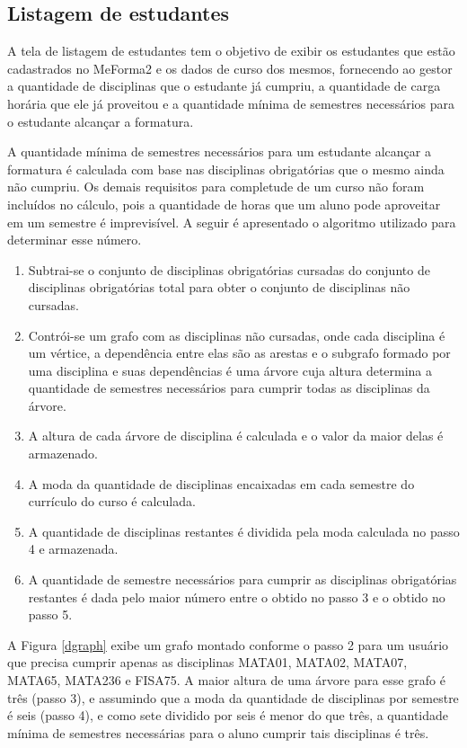 \subsection{Listagem de estudantes}

A tela de listagem de estudantes tem o objetivo de exibir os estudantes que estão cadastrados no MeForma2 e os dados de curso dos mesmos, fornecendo ao gestor a quantidade de disciplinas que o estudante já cumpriu, a quantidade de carga horária que ele já proveitou e a quantidade mínima de semestres necessários para o estudante alcançar a formatura.

A quantidade mínima de semestres necessários para um estudante alcançar a formatura é calculada com base nas disciplinas obrigatórias que o mesmo ainda não cumpriu. Os demais requisitos para completude de um curso não foram incluídos no cálculo, pois a quantidade de horas que um aluno pode aproveitar em um semestre é imprevisível. A seguir é apresentado o algoritmo utilizado para determinar esse número.

\begin{enumerate}
    \item Subtrai-se o conjunto de disciplinas obrigatórias cursadas do conjunto de disciplinas obrigatórias total para obter o conjunto de disciplinas não cursadas.
    \item Contrói-se um grafo com as disciplinas não cursadas, onde cada disciplina é um vértice, a dependência entre elas são as arestas e o subgrafo formado por uma disciplina e suas dependências é uma árvore cuja altura determina a quantidade de semestres necessários para cumprir todas as disciplinas da árvore.
    \item A altura de cada árvore de disciplina é calculada e o valor da maior delas é armazenado.
    \item A moda da quantidade de disciplinas encaixadas em cada semestre do currículo do curso é calculada.
    \item A quantidade de disciplinas restantes é dividida pela moda calculada no passo 4 e armazenada.
    \item A quantidade de semestre necessários para cumprir as disciplinas obrigatórias restantes é dada pelo maior número entre o obtido no passo 3 e o obtido no passo 5.
\end{enumerate}

A Figura \ref{dgraph} exibe um grafo montado conforme o passo 2 para um usuário que precisa cumprir apenas as disciplinas MATA01, MATA02, MATA07, MATA65, MATA236 e FISA75. A maior altura de uma árvore para esse grafo é três (passo 3), e assumindo que a moda da quantidade de disciplinas por semestre é seis (passo 4), e como sete dividido por seis é menor do que três, a quantidade mínima de semestres necessárias para o aluno cumprir tais disciplinas é três. 

